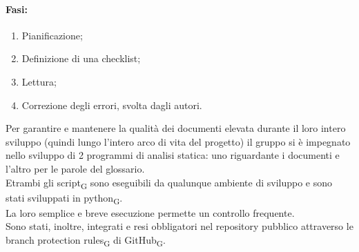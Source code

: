 \paragraph {Fasi:}\:
\begin{enumerate}
	\item Pianificazione;
	\item Definizione di una checklist;
	\item Lettura;
	\item Correzione degli errori, svolta dagli autori.
\end{enumerate}
Per garantire e mantenere la qualità dei documenti elevata durante il loro intero sviluppo (quindi lungo
l’intero arco di vita del progetto) il gruppo si è impegnato nello sviluppo di 2 programmi di analisi statica:
uno riguardante i documenti e l'altro per le parole del glossario.\\
Etrambi gli script\textsubscript{G} sono eseguibili da qualunque ambiente di sviluppo e sono stati sviluppati in python\textsubscript{G}.\\
La loro semplice e breve esecuzione permette un controllo frequente.\\
Sono stati, inoltre, integrati e resi obbligatori nel repository pubblico attraverso le branch protection rules\textsubscript{G} di GitHub\textsubscript{G}.
